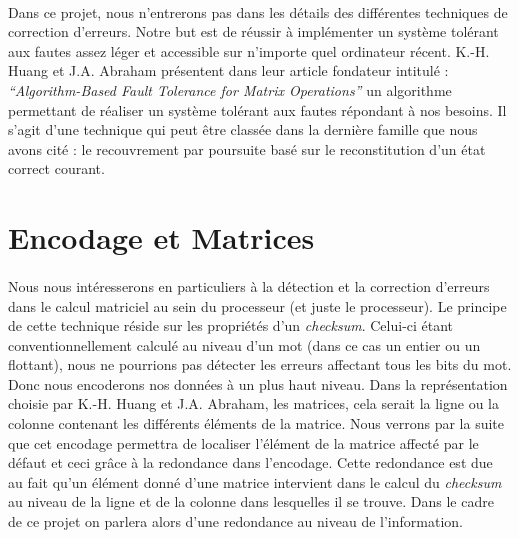 \documentclass[a4paper, 10pt]{report}
\begin{document}
\paragraph*{}
Dans ce projet, nous n’entrerons pas dans les détails des différentes techniques de correction d’erreurs. 
Notre but est de réussir à implémenter un système tolérant aux fautes assez léger et accessible sur n’importe 
quel ordinateur récent.
K.-H. Huang et J.A. Abraham présentent dans leur article fondateur intitulé : \textit{``Algorithm-Based 
Fault Tolerance for Matrix Operations''} \cite{Huang} un algorithme permettant de réaliser un système tolérant aux fautes 
répondant à nos besoins. Il s'agit d'une technique qui peut être classée dans la dernière famille que nous avons cité : 
le recouvrement par poursuite basé sur le reconstitution d'un état correct courant.  
\newpage
\section{Encodage et Matrices}
\paragraph*{}
Nous nous intéresserons en particuliers à la détection et la correction d’erreurs dans le calcul matriciel 
au sein du processeur (et juste le processeur). Le principe de cette technique réside sur les propriétés d’un 
\textit{checksum}. Celui-ci étant conventionnellement calculé au niveau d’un mot (dans ce cas un entier ou un flottant), 
nous ne pourrions pas détecter les erreurs affectant tous les bits du mot. Donc nous encoderons nos données à 
un plus haut niveau.\newline
Dans la représentation choisie par K.-H. Huang et J.A. Abraham, les matrices, cela serait la ligne ou la colonne
contenant les différents éléments de la matrice. Nous verrons par la suite que cet encodage permettra de localiser 
l’élément de la matrice affecté par le défaut et ceci grâce à la redondance dans l’encodage. Cette redondance est due au 
fait qu’un élément donné d’une matrice intervient dans le calcul du \textit{checksum} au niveau de la ligne et de la 
colonne dans lesquelles il se trouve. Dans le cadre de ce projet on parlera alors d’une redondance au niveau de 
l’information.
\end{document}

